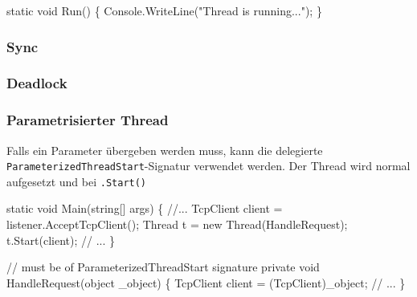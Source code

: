 \documentclass[
  9pt,
  a4paperpaper,
  DIV=11]{scrartcl}
\newenvironment{Shaded}{}{}
\newcommand{\CommentTok}[1]{\textcolor[rgb]{0.42,0.45,0.49}{#1}}
\newcommand{\DataTypeTok}[1]{\textcolor[rgb]{0.84,0.23,0.29}{#1}}
\newcommand{\FunctionTok}[1]{\textcolor[rgb]{0.44,0.26,0.76}{#1}}
\newcommand{\KeywordTok}[1]{\textcolor[rgb]{0.84,0.23,0.29}{#1}}
\newcommand{\NormalTok}[1]{\textcolor[rgb]{0.14,0.16,0.18}{#1}}
\newcommand{\OperatorTok}[1]{\textcolor[rgb]{0.14,0.16,0.18}{#1}}
\newcommand{\StringTok}[1]{\textcolor[rgb]{0.01,0.18,0.38}{#1}}
\numberwithin{equation}{section}
\begin{document}
\begin{multicols}{2}
\begin{Shaded}
\begin{Highlighting}[]
\KeywordTok{static} \DataTypeTok{void} \FunctionTok{Run}\OperatorTok{()} \OperatorTok{\{}
\NormalTok{  Console}\OperatorTok{.}\FunctionTok{WriteLine}\OperatorTok{(}\StringTok{"Thread is running..."}\OperatorTok{);}
\OperatorTok{\}}
\end{Highlighting}
\end{Shaded}

\hypertarget{sync}{%
\subsubsection{Sync}\label{sync}}

\hypertarget{deadlock}{%
\subsubsection{Deadlock}\label{deadlock}}

\hypertarget{parametrisierter-thread}{%
\subsubsection{Parametrisierter Thread}\label{parametrisierter-thread}}

Falls ein Parameter übergeben werden muss, kann die delegierte
\texttt{ParameterizedThreadStart}-Signatur verwendet werden. Der Thread
wird normal aufgesetzt und bei \texttt{.Start()}

\begin{Shaded}
\begin{Highlighting}[]
\KeywordTok{static} \DataTypeTok{void} \FunctionTok{Main}\OperatorTok{(}\DataTypeTok{string}\OperatorTok{[]}\NormalTok{ args}\OperatorTok{)}
\OperatorTok{\{}
  \CommentTok{//...}
\NormalTok{  TcpClient client }\OperatorTok{=}\NormalTok{ listener}\OperatorTok{.}\FunctionTok{AcceptTcpClient}\OperatorTok{();}
\NormalTok{  Thread t }\OperatorTok{=} \KeywordTok{new} \FunctionTok{Thread}\OperatorTok{(}\NormalTok{HandleRequest}\OperatorTok{);}
\NormalTok{  t}\OperatorTok{.}\FunctionTok{Start}\OperatorTok{(}\NormalTok{client}\OperatorTok{);}
  \CommentTok{// ...}
\OperatorTok{\}}

\CommentTok{// must be of ParameterizedThreadStart signature}
\KeywordTok{private} \DataTypeTok{void} \FunctionTok{HandleRequest}\OperatorTok{(}\DataTypeTok{object}\NormalTok{ \_object}\OperatorTok{)}
\OperatorTok{\{}
\NormalTok{  TcpClient client }\OperatorTok{=} \OperatorTok{(}\NormalTok{TcpClient}\OperatorTok{)}\NormalTok{\_object}\OperatorTok{;}
  \CommentTok{// ...}
\OperatorTok{\}}
\end{Highlighting}
\end{Shaded}


\end{multicols}
\end{document}
